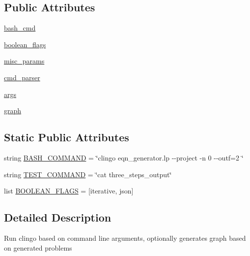\subsection*{Public Attributes}
\begin{DoxyCompactItemize}
\item 
\hyperlink{classdag__gen_1_1_clingo_runner_a492a99985894a1ae69f7b38af7d285e5}{bash\+\_\+cmd}
\item 
\hyperlink{classdag__gen_1_1_clingo_runner_a3700bc111e62e4f818f7e5681660e531}{boolean\+\_\+flags}
\item 
\hyperlink{classdag__gen_1_1_clingo_runner_a2b2372c6cc18c1448476a3630b82a949}{misc\+\_\+params}
\item 
\hyperlink{classdag__gen_1_1_clingo_runner_aca2f82b398bcefe24a04c43b77481a67}{cmd\+\_\+parser}
\item 
\hyperlink{classdag__gen_1_1_clingo_runner_a0fe5719667663d763ca57ebb8001546f}{args}
\item 
\hyperlink{classdag__gen_1_1_clingo_runner_af2b25ea63f098e5b596944511e5a09f1}{graph}
\end{DoxyCompactItemize}
\subsection*{Static Public Attributes}
\begin{DoxyCompactItemize}
\item 
string \hyperlink{classdag__gen_1_1_clingo_runner_ae58afdbd0d16c11d9a6319117d9a3593}{B\+A\+S\+H\+\_\+\+C\+O\+M\+M\+A\+N\+D} = \char`\"{}clingo eqn\+\_\+generator.\+lp -\/-\/project -\/n 0 -\/-\/outf=2 \char`\"{}
\item 
string \hyperlink{classdag__gen_1_1_clingo_runner_aa7b89cf2eba47c9b33f009f34848be46}{T\+E\+S\+T\+\_\+\+C\+O\+M\+M\+A\+N\+D} = \char`\"{}cat three\+\_\+steps\+\_\+output\char`\"{}
\item 
list \hyperlink{classdag__gen_1_1_clingo_runner_a02e60fad8150929b05e3f7ea78b96c7f}{B\+O\+O\+L\+E\+A\+N\+\_\+\+F\+L\+A\+G\+S} = \mbox{[}\textquotesingle{}iterative\textquotesingle{}, \textquotesingle{}json\textquotesingle{}\mbox{]}
\end{DoxyCompactItemize}


\subsection{Detailed Description}
\begin{DoxyVerb}Run clingo based on command line arguments, optionally generates graph based on generated problems\end{DoxyVerb}
 

